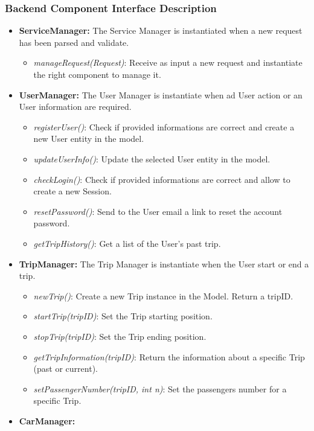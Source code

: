 \subsubsection{Backend Component Interface Description}
\begin{itemize}
	\item{\textbf{ServiceManager:}
		The Service Manager is instantiated when a new request has been parsed and validate.
			\begin{itemize}
				\item \textit{manageRequest(Request)}: Receive as input a new request and instantiate the right component to manage it.
			\end{itemize}
		}
	\item{\textbf{UserManager:}
	The User Manager is instantiate when ad User action or an User information are required.
	\begin{itemize}
		\item \textit{registerUser()}: Check if provided informations are correct and create a new User entity in the model.		
		\item \textit{updateUserInfo()}: Update the selected User entity in the model.
		\item \textit{checkLogin()}: Check if provided informations are correct and allow to create a new Session.
		\item \textit{resetPassword()}: Send to the User email a link to reset the account password.
		\item \textit{getTripHistory()}: Get a list of the User's past trip.
	\end{itemize}
}
	\item{\textbf{TripManager:}
	The Trip Manager is instantiate when the User start or end a trip.
	\begin{itemize}
		\item \textit{newTrip()}: Create a new Trip instance in the Model. Return a tripID.
		\item \textit{startTrip(tripID)}: Set the Trip starting position.
		\item \textit{stopTrip(tripID)}: Set the Trip ending position.
		\item \textit{getTripInformation(tripID)}: Return the information about a specific Trip (past or current).
		\item \textit{setPassengerNumber(tripID, int n)}: Set the passengers number for a specific Trip.
	\end{itemize}
}
	\item{\textbf{CarManager:}
}
\end{itemize}
